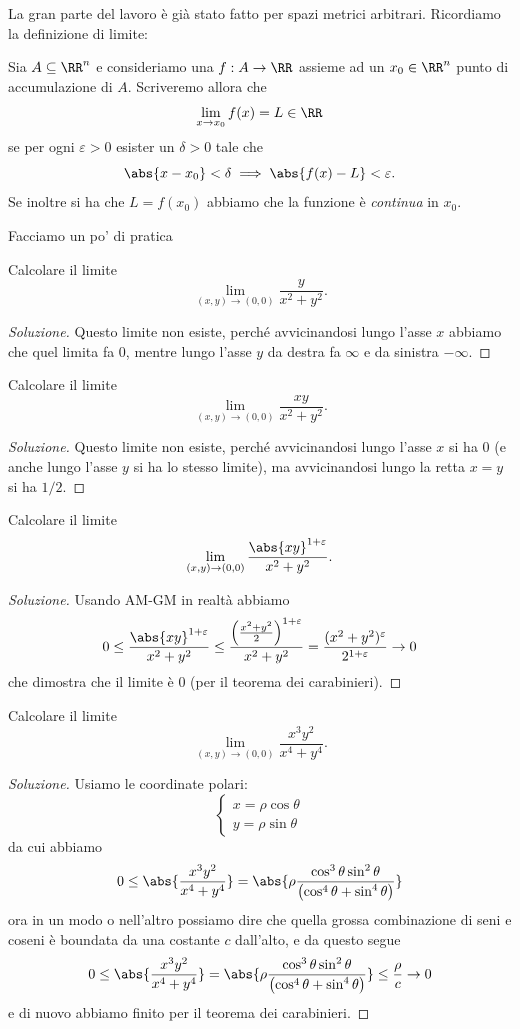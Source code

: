 \documentclass[11pt]{scrartcl}
\begin{document}
	La gran parte del lavoro è già stato fatto per spazi metrici arbitrari. Ricordiamo la definizione di limite:
	\begin{definition}
		Sia $A\subseteq \RR^n$ e consideriamo una $f:A\to\RR$ assieme ad un $x_0\in \RR^n$ punto di accumulazione di $A$. Scriveremo allora che 
		$$\lim_{x\to x_0}f(x)=L\in \RR$$
		se per ogni $\varepsilon>0$ esister un $\delta>0$ tale che
		$$\abs{x-x_0}<\delta \implies \abs{f(x)-L}<\varepsilon.$$
		Se inoltre si ha che $L=f(x_0)$ abbiamo che la funzione è \textit{continua} in $x_0$.
	\end{definition}
	Facciamo un po' di pratica 
	\begin{exercise}
		Calcolare il limite
		$$\lim_{(x,y)\to (0,0)}\frac{y}{x^2+y^2}.$$
	\end{exercise}
	\begin{proof}[Soluzione]
		Questo limite non esiste, perché avvicinandosi lungo l'asse $x$ abbiamo che quel limita fa $0$, mentre lungo l'asse $y$ da destra fa $\infty$ e da sinistra $-\infty$.
	\end{proof}
	\begin{exercise}
		Calcolare il limite
		$$\lim_{(x,y)\to (0,0)}\frac{xy}{x^2+y^2}.$$
	\end{exercise}
	\begin{proof}[Soluzione]
		Questo limite non esiste, perché avvicinandosi lungo l'asse $x$ si ha $0$ (e anche lungo l'asse $y$ si ha lo stesso limite), ma avvicinandosi lungo la retta $x=y$ si ha $1/2$.
	\end{proof}
	\begin{exercise}
		Calcolare il limite
		$$\lim_{(x,y)\to (0,0)}\frac{\abs{xy}^{1+\varepsilon}}{x^2+y^2}.$$
	\end{exercise}
	\begin{proof}[Soluzione]
		Usando AM-GM in realtà abbiamo
		$$0\le \frac{\abs{xy}^{1+\varepsilon}}{x^2+y^2}\le \frac{\left(\frac{x^2+y^2}{2}\right)^{1+\varepsilon}}{x^2+y^2}=\frac{(x^2+y^2)^\varepsilon}{2^{1+\varepsilon}}\to 0$$
		che dimostra che il limite è $0$ (per il teorema dei carabinieri).
	\end{proof}
	\begin{exercise}
		Calcolare il limite
		$$\lim_{(x,y)\to (0,0)}\frac{x^3y^2}{x^4+y^4}.$$
	\end{exercise}
	\begin{proof}[Soluzione]
		Usiamo le coordinate polari:
		$$
		\begin{cases}
			x=\rho \cos\theta \\
			y = \rho \sin\theta
		\end{cases}
		$$
		da cui abbiamo
		$$0\le \abs{\frac{x^3y^2}{x^4+y^4}}=\abs{\rho\frac{\cos^3\theta\sin^2\theta}{\left(\cos^4\theta+\sin^4\theta\right)}}$$
		ora in un modo o nell'altro possiamo dire che quella grossa combinazione di seni e coseni è boundata da una costante $c$ dall'alto, e da questo segue 
		$$0\le \abs{\frac{x^3y^2}{x^4+y^4}}=\abs{\rho\frac{\cos^3\theta\sin^2\theta}{\left(\cos^4\theta+\sin^4\theta\right)}}\le \frac{\rho}{c}\to 0$$
		e di nuovo abbiamo finito per il teorema dei carabinieri.
	\end{proof}
\end{document}
